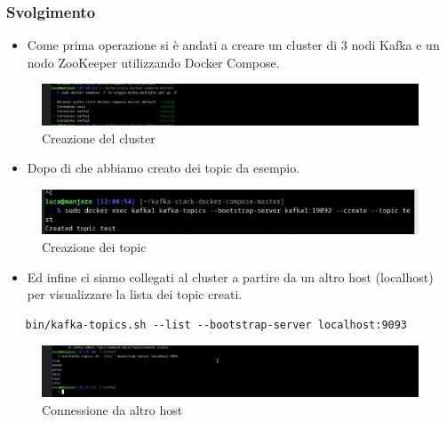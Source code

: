 \documentclass{article}
\begin{document}
\subsubsection{Svolgimento}
\begin{itemize}
    \item Come prima operazione si è andati a creare un cluster di 3 nodi Kafka e un nodo ZooKeeper utilizzando Docker Compose.
\end{itemize}
\begin{figure}[H]
    \centering
    \includegraphics[scale=0.5]{images/cluster.png}
    \caption{Creazione del cluster}
    \label{fig:my_label}
\end{figure}
\begin{itemize}
    \item Dopo di che abbiamo creato dei topic da esempio.
\end{itemize}
\begin{figure}[H]
    \centering
    \includegraphics[scale=0.5]{images/create_topic.png}
    \caption{Creazione dei topic}
    \label{fig:my_label}
\end{figure}
\begin{itemize}
    \item Ed infine ci siamo collegati al cluster a partire da un altro host (localhost) per visualizzare la lista dei topic creati.
\end{itemize}
\begin{lstlisting}
   bin/kafka-topics.sh --list --bootstrap-server localhost:9093
\end{lstlisting}
\begin{figure}[H]
    \centering
    \includegraphics[scale=0.5]{images/test_connect_another_host.png}
    \caption{Connessione da altro host}
    \label{fig:my_label}
\end{figure}




\end{document}
